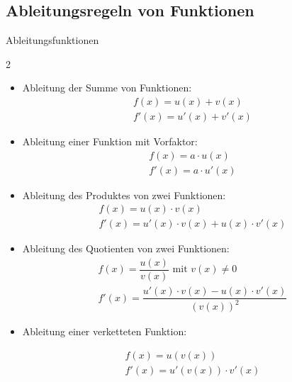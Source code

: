 \subsection{Ableitungsregeln von Funktionen}
\begin{defi}{Ableitungsfunktionen}{}\label{AbleitungEFunktion}
\begin{multicols}{2}
\begin{itemize}
    \item Ableitung der Summe von Funktionen:
    \begin{gather*} 
	f(x) = u(x) + v(x) \\
	f'(x) = u'(x)+ v'(x)
	\end{gather*}
     \item Ableitung einer Funktion mit Vorfaktor:
    \begin{gather*} 
	f(x) = a\cdot u(x)  \\
	f'(x) = a\cdot u'(x) 
	\end{gather*}
       \item Ableitung des Produktes von zwei Funktionen:
    \begin{gather*} 
	f(x) = u(x) \cdot v(x)  \\
	f'(x) = u'(x) \cdot v(x) + u(x) \cdot v'(x)
	\end{gather*}     
        \item Ableitung des Quotienten von zwei Funktionen:
    \begin{gather*} 
	f(x) = \dfrac{u(x)}{v(x)} \text{ mit } v(x)\neq 0  \\
	f'(x) = \dfrac{u'(x)\cdot v(x) - u(x) \cdot v'(x)}{(v(x))^2}
	\end{gather*} 
         \item Ableitung einer verketteten Funktion:

   \begin{gather*} 
	f(x) = u(v(x))  \\
	f'(x) = u'(v(x)) \cdot v'(x)
	\end{gather*} 

\end{itemize}   
\end{multicols}
\end{defi}
